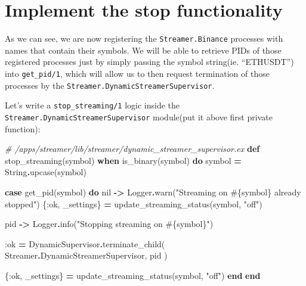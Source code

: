\documentclass[
]{book}
\newenvironment{Shaded}{\begin{snugshade}}{\end{snugshade}}
\newcommand{\CommentTok}[1]{\textcolor[rgb]{0.56,0.35,0.01}{\textit{#1}}}
\newcommand{\ConstantTok}[1]{\textcolor[rgb]{0.00,0.00,0.00}{#1}}
\newcommand{\KeywordTok}[1]{\textcolor[rgb]{0.13,0.29,0.53}{\textbf{#1}}}
\newcommand{\NormalTok}[1]{#1}
\newcommand{\OperatorTok}[1]{\textcolor[rgb]{0.81,0.36,0.00}{\textbf{#1}}}
\newcommand{\OtherTok}[1]{\textcolor[rgb]{0.56,0.35,0.01}{#1}}
\newcommand{\StringTok}[1]{\textcolor[rgb]{0.31,0.60,0.02}{#1}}
\newcommand{\VariableTok}[1]{\textcolor[rgb]{0.00,0.00,0.00}{#1}}
\begin{document}
\hypertarget{implement-the-stop-functionality}{%
\section{Implement the stop functionality}\label{implement-the-stop-functionality}}

As we can see, we are now registering the \texttt{Streamer.Binance} processes with names that contain their symbols. We will be able to retrieve PIDs of those registered processes just by simply passing the symbol string(ie. ``ETHUSDT'') into \texttt{get\_pid/1}, which will allow us to then request termination of those processes by the \texttt{Streamer.DynamicStreamerSupervisor}.

Let's write a \texttt{stop\_streaming/1} logic inside the \texttt{Streamer.DynamicStreamerSupervisor} module(put it above first private function):

\begin{Shaded}
\begin{Highlighting}[]
  \CommentTok{\# /apps/streamer/lib/streamer/dynamic\_streamer\_supervisor.ex}
  \KeywordTok{def}\NormalTok{ stop\_streaming(symbol) }\KeywordTok{when}\NormalTok{ is\_binary(symbol) }\KeywordTok{do}
\NormalTok{    symbol }\OperatorTok{=} \ConstantTok{String}\OperatorTok{.}\NormalTok{upcase(symbol)}

    \KeywordTok{case}\NormalTok{ get\_pid(symbol) }\KeywordTok{do}
      \ConstantTok{nil} \OperatorTok{{-}\textgreater{}}
        \ConstantTok{Logger}\OperatorTok{.}\NormalTok{warn(}\StringTok{"Streaming on }\OtherTok{\#\{}\NormalTok{symbol}\OtherTok{\}}\StringTok{ already stopped"}\NormalTok{)}
\NormalTok{        \{}\VariableTok{:ok}\NormalTok{, \_settings\} }\OperatorTok{=}\NormalTok{ update\_streaming\_status(symbol, }\StringTok{"off"}\NormalTok{)}

\NormalTok{      pid }\OperatorTok{{-}\textgreater{}}
        \ConstantTok{Logger}\OperatorTok{.}\NormalTok{info(}\StringTok{"Stopping streaming on }\OtherTok{\#\{}\NormalTok{symbol}\OtherTok{\}}\StringTok{"}\NormalTok{)}

        \VariableTok{:ok} \OperatorTok{=}
          \ConstantTok{DynamicSupervisor}\OperatorTok{.}\NormalTok{terminate\_child(}
            \ConstantTok{Streamer}\OperatorTok{.}\ConstantTok{DynamicStreamerSupervisor}\NormalTok{,}
\NormalTok{            pid}
\NormalTok{          )}

\NormalTok{        \{}\VariableTok{:ok}\NormalTok{, \_settings\} }\OperatorTok{=}\NormalTok{ update\_streaming\_status(symbol, }\StringTok{"off"}\NormalTok{)}
    \KeywordTok{end}
  \KeywordTok{end}
\end{Highlighting}
\end{Shaded}
\end{document}
